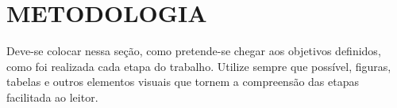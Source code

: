 \chapter{METODOLOGIA}\label{chp:METODOLOGIA}

Deve-se colocar nessa seção, como pretende-se chegar aos objetivos definidos, como foi realizada cada etapa do trabalho. Utilize sempre que possível, figuras, tabelas e outros elementos visuais que tornem a compreensão das etapas facilitada ao leitor.